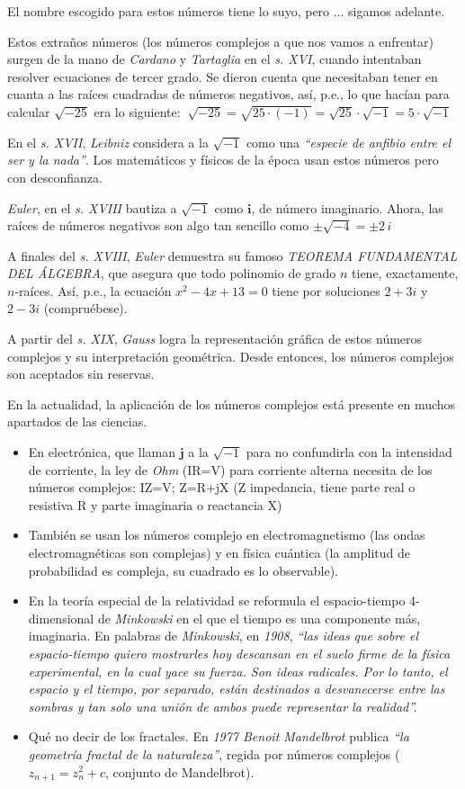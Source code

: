 \vspace{0.5cm}
El nombre escogido para estos números tiene lo suyo, pero ... sigamos adelante.

Estos extraños números (los números complejos a que nos vamos a enfrentar) surgen de la mano de \emph{Cardano} y \emph{Tartaglia} en el \emph{s. XVI}, cuando intentaban resolver ecuaciones de tercer grado. Se dieron cuenta que necesitaban tener en cuanta a las raíces cuadradas de números negativos, así, p.e., lo que hacían para calcular $\sqrt{-25}$ era lo siguiente: $\ \sqrt{-25} = \sqrt{25\cdot (-1)}=\sqrt{25}\cdot \sqrt{-1}=5\cdot \sqrt{-1}$

En el \emph{s. XVII}, \emph{Leibniz} considera a la $\sqrt{-1}$ como una \emph{``especie de anfibio entre el ser y la nada''}. Los matemáticos y físicos de la época usan estos números pero con desconfianza.

\emph{Euler}, en el \emph{s. XVIII} bautiza a $\sqrt{-1}$ como $\boldsymbol i$, de número imaginario. Ahora, las raíces de números negativos son algo tan sencillo como $\pm \sqrt{-4}=\pm 2\, i$

A finales del \emph{s. XVIII}, \emph{Euler} demuestra su famoso \emph{TEOREMA FUNDAMENTAL DEL ÁLGEBRA}, que asegura que todo polinomio de grado $n$ tiene, exactamente, $n$-raíces. Así, p.e., la ecuación $x^2-4x+13=0$ tiene por soluciones $2+3i$ y $2-3i$ (compruébese).

A partir del \emph{s. XIX}, \emph{Gauss} logra la representación gráfica de estos números complejos y su interpretación geométrica. Desde entonces, los números complejos son aceptados sin reservas.

En la actualidad, la aplicación de los números complejos está presente en muchos apartados de las ciencias.
\begin{itemize}
\item En electrónica, que llaman $\boldsymbol j$ a la $\sqrt{-1}$ para no confundirla con la intensidad de corriente, la ley de \emph{Ohm} (IR=V) para corriente alterna necesita de los números complejos: IZ=V; Z=R+jX (Z impedancia, tiene parte real o resistiva R y parte imaginaria o reactancia X)
\item También se usan los números complejo en electromagnetismo (las ondas electromagnéticas son complejas) y en física cuántica (la amplitud de probabilidad es compleja, su cuadrado es lo observable).
\item En la teoría especial de la relatividad se reformula el espacio-tiempo 4-dimensional de \emph{Minkowski} en el que el tiempo es una componente más, imaginaria. En palabras de \emph{Minkowski}, en \emph{1908}, \emph{``las ideas que sobre el espacio-tiempo quiero mostrarles hoy descansan en el suelo firme de la física experimental, en la cual yace su fuerza. Son ideas radicales. Por lo tanto, el espacio y el tiempo, por separado, están destinados a desvanecerse entre las sombras y tan solo una unión de ambos puede representar la realidad''.}
\item Qué no decir de los fractales. En \emph{1977 Benoit Mandelbrot} publica \emph{``la geometría fractal de la naturaleza''}, regida por números complejos ($z_{n+1}=z_n^2+c$, conjunto de Mandelbrot).
\end{itemize}


